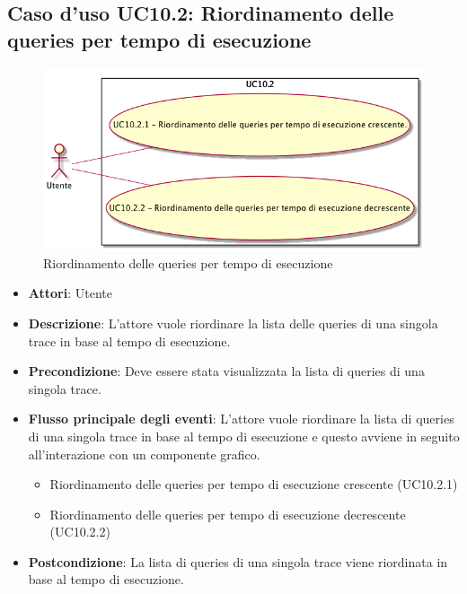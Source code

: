 \subsection{Caso d'uso UC10.2: Riordinamento delle queries per tempo di esecuzione}
\begin{figure} [H]
\centering
\includegraphics[scale=0.45]{./UC/UC10-2.png}
\caption{Riordinamento delle queries per tempo di esecuzione}\label{}
\end{figure}
\begin{itemize}
\item \textbf{Attori}: Utente
\item \textbf{Descrizione}: L'attore vuole riordinare la lista delle queries di una singola trace in base al tempo di esecuzione.
\item \textbf{Precondizione}: Deve essere stata visualizzata la lista di queries di una singola trace.
\item \textbf{Flusso principale degli eventi}: L'attore vuole riordinare la lista di queries di una singola trace in base al tempo di esecuzione e questo avviene in seguito all'interazione con un componente grafico.
\begin{itemize}
\item Riordinamento delle queries per tempo di esecuzione crescente (UC10.2.1)
\item Riordinamento delle queries per tempo di esecuzione decrescente (UC10.2.2)
\end{itemize}
\item \textbf{Postcondizione}: La lista di queries di una singola trace viene riordinata in base al tempo di esecuzione.
\end{itemize}
